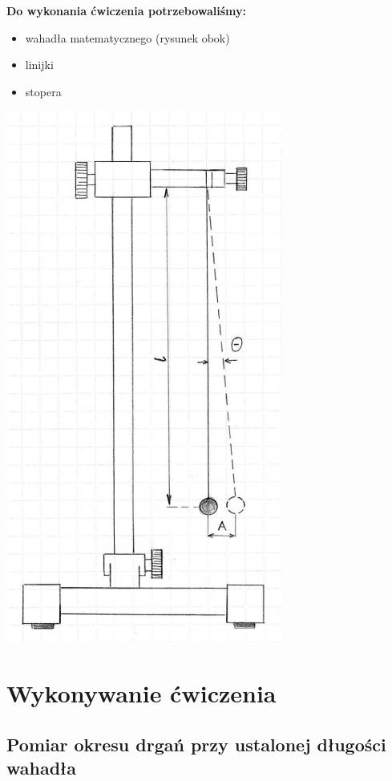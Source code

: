 \documentclass[a4paper,11pt]{article}
\begin{document}
\begin{minipage}{10cm}
\vspace{-5cm}
\textbf{Do wykonania ćwiczenia potrzebowaliśmy:}
\begin{itemize}
\item wahadła matematycznego (rysunek obok)
\item linijki
\item stopera
\end{itemize} 
\end{minipage}
\begin{minipage}{5cm}
\includegraphics[scale=0.5]{wahadlo.png} 
\end{minipage}

\newpage

\section{Wykonywanie ćwiczenia}
\subsection{Pomiar okresu drgań przy ustalonej długości wahadła}
\end{document}
